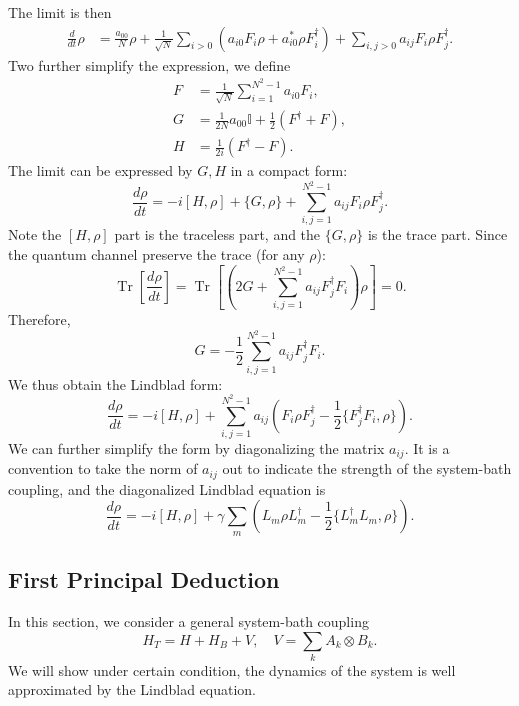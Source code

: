 \documentclass[aps,prb,superscriptaddress,nofootinbib]{revtex4}
\def \Tr{\operatorname{Tr}}
\begin{document}
The limit is then
\begin{equation}
\begin{aligned}
	\frac{d}{dt}\rho 
	&= \frac{a_{00}}{N}\rho + \frac{1}{\sqrt N} \sum_{i>0} \left(a_{i0} F_i \rho + a_{i0}^*\rho F_i^\dagger\right) + \sum_{i,j>0} a_{ij} F_i \rho F_j^\dagger. 
\end{aligned}
\end{equation}
Two further simplify the expression, we define
\begin{equation}
\begin{aligned}
	F &= \frac{1}{\sqrt N} \sum_{i=1}^{N^2-1} a_{i0} F_i, \\
	G &= \frac{1}{2N}a_{00}\mathbb I +\frac{1}{2}(F^\dagger+F), \\
	H &= \frac{1}{2i}(F^\dagger-F).
\end{aligned}
\end{equation}
The limit can be expressed by $G,H$ in a compact form:
\begin{equation}
	\frac{d\rho}{dt} = -i[H,\rho]+\{G, \rho\}+\sum_{i,j=1}^{N^2-1}a_{ij}F_i\rho F_j^\dagger.
\end{equation}
Note the $[H,\rho]$ part is the traceless part, and the $\{G,\rho\}$ is the trace part.
Since the quantum channel preserve the trace (for any $\rho$):
\begin{equation}
	\Tr\left[\frac{d\rho}{dt}\right]= \Tr\left[ \left(2G+\sum_{i,j=1}^{N^2-1}a_{ij}F_j^\dagger F_i \right)\rho \right]=0.
\end{equation}
Therefore,
\begin{equation}
	G = -\frac{1}{2}\sum_{i,j=1}^{N^2-1}a_{ij}F_j^\dagger F_i.
\end{equation}
We thus obtain the Lindblad form:
\begin{equation}
	\frac{d\rho}{dt} = -i[H,\rho]+\sum_{i,j=1}^{N^2-1}a_{ij} \left(F_i\rho F_j^\dagger-\frac{1}{2}\{F_j^\dagger F_i, \rho\} \right).
\end{equation}
We can further simplify the form by diagonalizing the matrix $a_{ij}$.
It is a convention to take the norm of $a_{ij}$ out to indicate the strength of the system-bath coupling, and the diagonalized Lindblad equation is
\begin{equation}
	\frac{d\rho}{dt} = -i[H,\rho]+ \gamma\sum_{m} \left(L_m\rho L_m^\dagger-\frac{1}{2}\{L_m^\dagger L_m, \rho\} \right).
\end{equation}


\subsection{First Principal Deduction}
In this section, we consider a general system-bath coupling
\begin{equation}
	H_T = H + H_B + V, \quad V = \sum_k A_k \otimes B_k.
\end{equation}
We will show under certain condition, the dynamics of the system is well approximated by the Lindblad equation.
\end{document}
